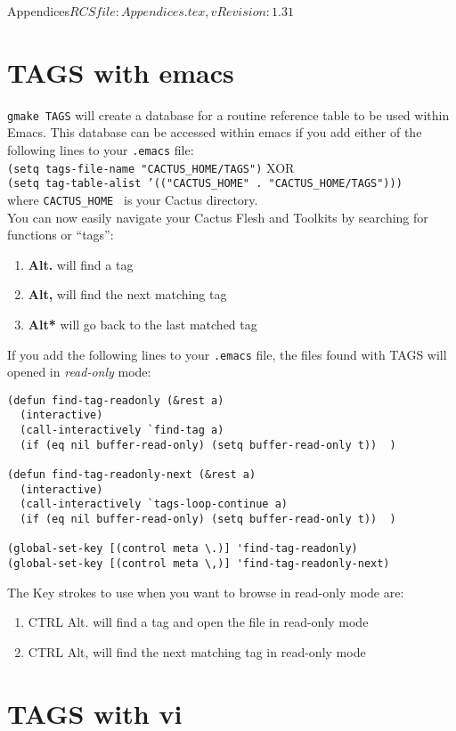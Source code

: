 \begin{cactuspart}{6}{Appendices}{$RCSfile: Appendices.tex,v $}{$Revision: 1.31 $}
\section{TAGS with emacs}
\label{sec:tawiem}

{\tt gmake TAGS} will create a database for a routine reference
table to be used within Emacs. This database can be accessed within
emacs if you add either of the following lines to your {\tt .emacs} file:\\
{\tt (setq tags-file-name "CACTUS\_HOME/TAGS")} XOR \\
{\tt (setq tag-table-alist '(("CACTUS\_HOME" . "CACTUS\_HOME/TAGS")))}\\
where {\tt CACTUS\_HOME } is your Cactus directory.\\

You can now easily navigate your Cactus Flesh and Toolkits by searching for
functions or ``tags'':
\begin{enumerate}
\item \textbf{ Alt.} will find a tag
\item \textbf{ Alt,} will find the next matching tag
\item \textbf{ Alt*} will go back to the last matched tag
\end{enumerate}
If you add the following lines to your {\tt .emacs} file, the
files found with TAGS will opened in {\em read-only} mode:
\begin{verbatim}
(defun find-tag-readonly (&rest a)
  (interactive)
  (call-interactively `find-tag a)
  (if (eq nil buffer-read-only) (setq buffer-read-only t))  )

(defun find-tag-readonly-next (&rest a)
  (interactive)
  (call-interactively `tags-loop-continue a)
  (if (eq nil buffer-read-only) (setq buffer-read-only t))  )

(global-set-key [(control meta \.)] 'find-tag-readonly)
(global-set-key [(control meta \,)] 'find-tag-readonly-next)
\end{verbatim}
The Key strokes to use when you want to browse in read-only mode are:
\begin{enumerate}
\item{CTRL Alt.} will find a tag and open the file in read-only mode
\item{CTRL Alt,} will find the next matching tag in read-only mode
\end{enumerate}

\section{TAGS with vi}
\label{sec:tawivi}


\end{cactuspart}
